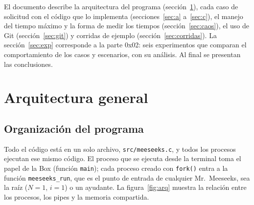 \documentclass[11pt,letterpaper]{article}
\begin{document}
El documento describe la arquitectura del programa (sección~\ref{sec:arq}), cada caso
de solicitud con el código que lo implementa (secciones~\ref{sec:a} a~\ref{sec:c}), el
manejo del tiempo máximo y la forma de medir los tiempos (sección~\ref{sec:caos}), el uso
de Git (sección~\ref{sec:git}) y corridas de ejemplo (sección~\ref{sec:corridas}). La
sección~\ref{sec:exp} corresponde a la parte 0x02: seis experimentos que comparan el
comportamiento de los casos y escenarios, con su análisis. Al final se presentan las
conclusiones.

\section{Arquitectura general}\label{sec:arq}

\subsection{Organización del programa}

Todo el código está en un solo archivo, \texttt{src/meeseeks.c}, y todos los procesos
ejecutan ese mismo código. El proceso que se ejecuta desde la terminal toma el papel de
la Box (función \texttt{main}); cada proceso creado con \texttt{fork()} entra a la función
\texttt{meeseeks\_run}, que es el punto de entrada de cualquier Mr.\ Meeseeks, sea la raíz
($N=1$, $i=1$) o un ayudante. La figura~\ref{fig:arq} muestra la relación entre los
procesos, los pipes y la memoria compartida.
\end{document}
